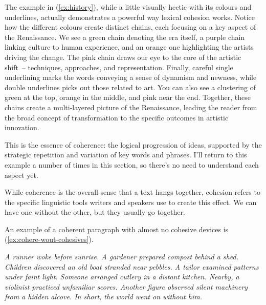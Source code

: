 \label{ex:history}
\z


The example in (\ref{ex:history}), while a little visually hectic with its colours and underlines, actually demonstrates a powerful way lexical cohesion works. Notice how the different colours create distinct chains, each focusing on a key aspect of the Renaissance. We see a green chain denoting the era itself, a purple chain linking culture to human experience, and an orange one highlighting the artists driving the change.  The pink chain draws our eye to the core of the artistic shift~-- techniques, approaches, and representation.  Finally, careful single underlining marks the words conveying a sense of dynamism and newness, while double underlines picks out those related to art. You can also see a clustering of green at the top, orange in the middle, and pink near the end. Together, these chains create a multi-layered picture of the Renaissance, leading the reader from the broad concept of transformation to the specific outcomes in artistic innovation.

This is the essence of coherence: the logical progression of ideas, supported by the strategic repetition and variation of key words and phrases. I'll return to this example a number of times in this section, so there's no need to understand each aspect yet.

While coherence is the overall sense that a text hangs together, cohesion refers to the specific linguistic tools writers and speakers use to create this effect. We can have one without the other, but they usually go together.

An example of a coherent paragraph with almost no cohesive devices is (\ref{ex:cohere-wout-cohesives}).

\ea \label{ex:cohere-wout-cohesives}
\textit{A runner woke before sunrise. A gardener prepared compost behind a shed. Children discovered an old boat stranded near pebbles. A tailor examined patterns under faint light. Someone arranged cutlery in a distant kitchen. Nearby, a violinist practiced unfamiliar scores. Another figure observed silent machinery from a hidden alcove. In short, the world went on without him.}
\z

